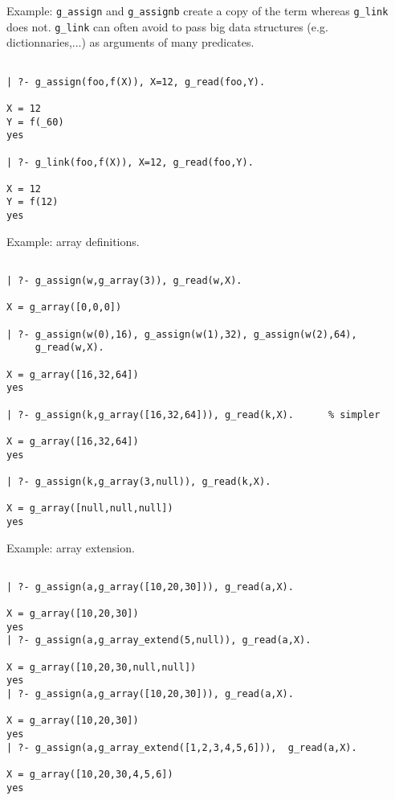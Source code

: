 Example: {\tt g\_assign} and {\tt g\_assignb} create a copy of the term
whereas {\tt g\_link} does not. {\tt g\_link} can often avoid
to pass big data structures (e.g. dictionnaries,...) as arguments of
many predicates.



\begin{verbatim}

| ?- g_assign(foo,f(X)), X=12, g_read(foo,Y).

X = 12
Y = f(_60)
yes

| ?- g_link(foo,f(X)), X=12, g_read(foo,Y).

X = 12
Y = f(12)
yes

\end{verbatim}


Example: array definitions.

\begin{verbatim}

| ?- g_assign(w,g_array(3)), g_read(w,X).

X = g_array([0,0,0])

| ?- g_assign(w(0),16), g_assign(w(1),32), g_assign(w(2),64), 
     g_read(w,X).

X = g_array([16,32,64])
yes

| ?- g_assign(k,g_array([16,32,64])), g_read(k,X).      % simpler

X = g_array([16,32,64])
yes

| ?- g_assign(k,g_array(3,null)), g_read(k,X).

X = g_array([null,null,null])
yes

\end{verbatim}



Example: array extension.

\begin{verbatim}

| ?- g_assign(a,g_array([10,20,30])), g_read(a,X).

X = g_array([10,20,30])
yes
| ?- g_assign(a,g_array_extend(5,null)), g_read(a,X).

X = g_array([10,20,30,null,null])
yes
| ?- g_assign(a,g_array([10,20,30])), g_read(a,X).

X = g_array([10,20,30])
yes
| ?- g_assign(a,g_array_extend([1,2,3,4,5,6])),  g_read(a,X).

X = g_array([10,20,30,4,5,6])
yes

\end{verbatim}



